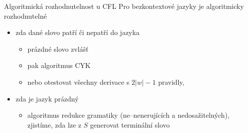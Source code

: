     
    \begin{frame}{Algoritmická rozhodnutelnost u CFL}
    Pro bezkontextové jazyky je algoritmicky rozhodnutelné
    \begin{itemize}
        \item zda dané slovo patří či nepatří do jazyka
        
        \begin{itemize}
        \item prázdné slovo zvlášť
            \item pak algoritmus CYK
            \item nebo otestovat všechny derivace s $2|w|-1 $ pravidly, 
        \end{itemize}
        \item zda je jazyk prázdný 
    \begin{itemize}
        \item algoritmus redukce gramatiky (ne--nenerujících a nedosažitelných), zjistíme, zda lze z $S$ generovat terminální slovo
    \end{itemize}
    \end{itemize}
    \end{frame}
    
